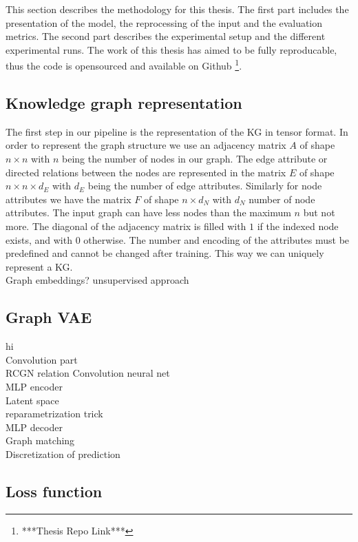This section describes the methodology for this thesis. The first part includes the presentation of the model, the reprocessing of the input and the evaluation metrics. The second part describes the experimental setup and the different experimental runs. The work of this thesis has aimed to be fully reproducable, thus the code is opensourced and available on Github \footnote{***Thesis Repo Link***}.

\subsection{Knowledge graph representation}

The first step in our pipeline is the representation of the KG in tensor format. In order to represent the graph structure we use an adjacency matrix $A$ of shape $n\times n$ with $n$ being the number of nodes in our graph. The edge attribute or directed relations between the nodes are represented in the matrix $E$ of shape $n\times n\times d_E$ with $d_E$ being the number of edge attributes. Similarly for node attributes we have the matrix $F$ of shape $n\times d_N$ with $d_N$ number of node attributes. The input graph can have less nodes than the maximum $n$ but not more. The diagonal of the adjacency matrix is filled with $1$ if the indexed node exists, and with $0$ otherwise. The number and encoding of the attributes must be predefined and cannot be changed after training. This way we can uniquely represent a KG.
\\


Graph embeddings? unsupervised approach

\subsection{Graph VAE}
hi
\\Convolution part
\\RCGN relation Convolution neural net
\\MLP encoder
\\Latent space
\\reparametrization trick
\\MLP decoder
\\Graph matching
\\Discretization of prediction

\subsection{Loss function}

